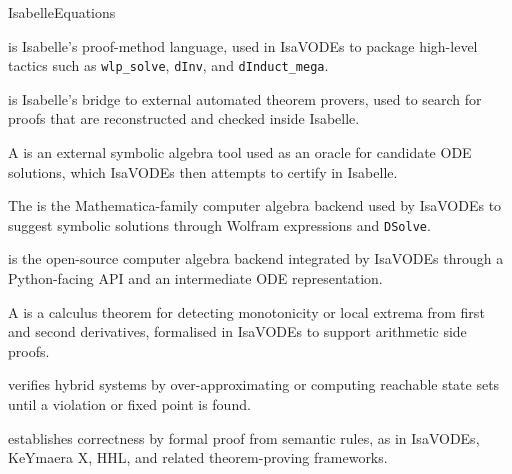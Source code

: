 \documentclass[hidelinks]{article}
\begin{document}
\begin{smodule}[title={IsaVODEs: Interactive Verification of Cyber-Physical Systems at Scale}]{IsabelleEquations}
\begin{sdefinition}[for=Eisbach]
     is Isabelle's proof-method language, used in IsaVODEs to package high-level tactics such as \texttt{wlp\_solve}, \texttt{dInv}, and \texttt{dInduct\_mega}.
\end{sdefinition}

\begin{sdefinition}[for=Sledgehammer]
     is Isabelle's bridge to external automated theorem provers, used to search for proofs that are reconstructed and checked inside Isabelle.
\end{sdefinition}

\begin{sdefinition}[for=ComputerAlgebraSystem]
    A  is an external symbolic algebra tool used as an oracle for candidate ODE solutions, which IsaVODEs then attempts to certify in Isabelle.
\end{sdefinition}

\begin{sdefinition}[for=WolframEngine]
    The  is the Mathematica-family computer algebra backend used by IsaVODEs to suggest symbolic solutions through Wolfram expressions and \texttt{DSolve}.
\end{sdefinition}

\begin{sdefinition}[for=SageMath]
     is the open-source computer algebra backend integrated by IsaVODEs through a Python-facing API and an intermediate ODE representation.
\end{sdefinition}

\begin{sdefinition}[for=DerivativeTest]
    A  is a calculus theorem for detecting monotonicity or local extrema from first and second derivatives, formalised in IsaVODEs to support arithmetic side proofs.
\end{sdefinition}

\begin{sdefinition}[for=ReachabilityAnalysis]
     verifies hybrid systems by over-approximating or computing reachable state sets until a violation or fixed point is found.
\end{sdefinition}

\begin{sdefinition}[for=DeductiveVerification]
     establishes correctness by formal proof from semantic rules, as in IsaVODEs, KeYmaera X, HHL, and related theorem-proving frameworks.
\end{sdefinition}


\end{smodule}
\end{document}
